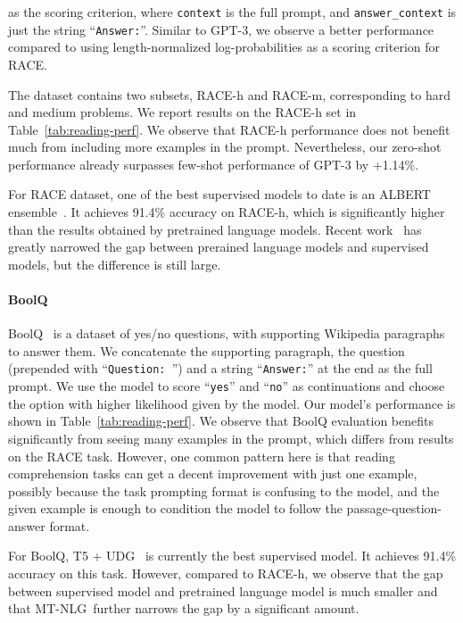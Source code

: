 \documentclass[11pt]{article}
\newcommand{\ours}{MT-NLG}
\begin{document}
as the scoring criterion, where \texttt{context} is the full prompt, and \texttt{answer\_context} is just the string ``\texttt{Answer:}''. Similar to GPT-3, we observe a better performance compared to using length-normalized log-probabilities as a scoring criterion for RACE.

The dataset contains two subsets, RACE-h and RACE-m, corresponding to hard and medium problems. We report results on the RACE-h set in Table~\ref{tab:reading-perf}. We observe that RACE-h performance does not benefit much from including more examples in the prompt. Nevertheless, our zero-shot performance already surpasses few-shot performance of GPT-3 by +1.14\%.

For RACE dataset, one of the best supervised models to date is an ALBERT ensemble~\cite{Jiang2020ImprovingMR}. It achieves 91.4\% accuracy on RACE-h, which is significantly higher than the results obtained by pretrained language models. Recent work~\cite{Rae2021Gopher} has greatly narrowed the gap between prerained language models and supervised models, but the difference is still large.

\paragraph{BoolQ} BoolQ~\citep{clark-etal-2019-boolq} is a dataset of yes/no questions, with supporting Wikipedia paragraphs to answer them. We concatenate the supporting paragraph, the question (prepended with ``\texttt{Question: }'') and a string ``\texttt{Answer:}'' at the end as the full prompt. We use the model to score ``\texttt{yes}'' and ``\texttt{no}'' as continuations and choose the option with higher likelihood given by the model. Our model's performance is shown in Table~\ref{tab:reading-perf}. We observe that BoolQ evaluation benefits significantly from seeing many examples in the prompt, which differs from results on the RACE task. However, one common pattern here is that reading comprehension tasks can get a decent improvement with just one example, possibly because the task prompting format is confusing to the model, and the given example is enough to condition the model to follow the passage-question-answer format.

For BoolQ, T5 + UDG~\cite{Wang2021TowardsZL} is currently the best supervised model. It achieves 91.4\% accuracy on this task. However, compared to RACE-h, we observe that the gap between supervised model and pretrained language model is much smaller and that \ours~further narrows the gap by a significant amount.
\end{document}
